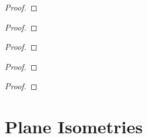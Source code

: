 \begin{exercise}
\end{exercise}

\begin{proof}
\end{proof}

\begin{exercise}
\end{exercise}

\begin{proof}
\end{proof}

\begin{exercise}
\end{exercise}

\begin{proof}
\end{proof}

\begin{exercise}
\end{exercise}

\begin{proof}
\end{proof}

\begin{exercise}
\end{exercise}

\begin{proof}
\end{proof}

\section{Plane Isometries}
